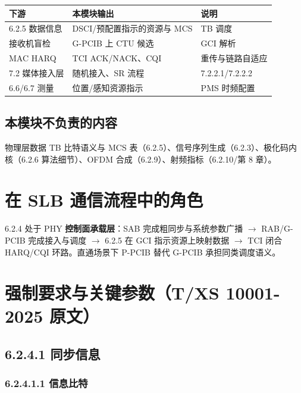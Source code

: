 \documentclass[11pt,a4paper]{ctexart}
\begin{document}
\begin{table}[h]
\centering
\small
\begin{tabular}{p{4cm}p{4.5cm}p{5.5cm}}
\toprule
\textbf{下游} & \textbf{本模块输出} & \textbf{说明} \\
\midrule
6.2.5 数据信息 & DSCI/预配置指示的资源与 MCS & TB 调度 \\
接收机盲检 & G-PCIB 上 CTU 候选 & GCI 解析 \\
MAC HARQ & TCI ACK/NACK、CQI & 重传与链路自适应 \\
7.2 媒体接入层 & 随机接入、SR 流程 & 7.2.2.1/7.2.2.2 \\
6.6/6.7 测量 & 位置/感知资源指示 & PMS 时频配置 \\
\bottomrule
\end{tabular}
\end{table}

\subsection{本模块不负责的内容}

物理层数据 TB 比特语义与 MCS 表（6.2.5）、信号序列生成（6.2.3）、极化码内核（6.2.6 算法细节）、OFDM 合成（6.2.9）、射频指标（6.2.10/第 8 章）。

\section{在 SLB 通信流程中的角色}

6.2.4 处于 PHY \textbf{控制面承载层}：SAB 完成粗同步与系统参数广播 $\rightarrow$ RAB/G-PCIB 完成接入与调度 $\rightarrow$ 6.2.5 在 GCI 指示资源上映射数据 $\rightarrow$ TCI 闭合 HARQ/CQI 环路。直通场景下 P-PCIB 替代 G-PCIB 承担同类调度语义。

\section{强制要求与关键参数（T/XS 10001-2025 原文）}

\subsection{6.2.4.1 同步信息}

\subsubsection{6.2.4.1.1 信息比特}
\end{document}
